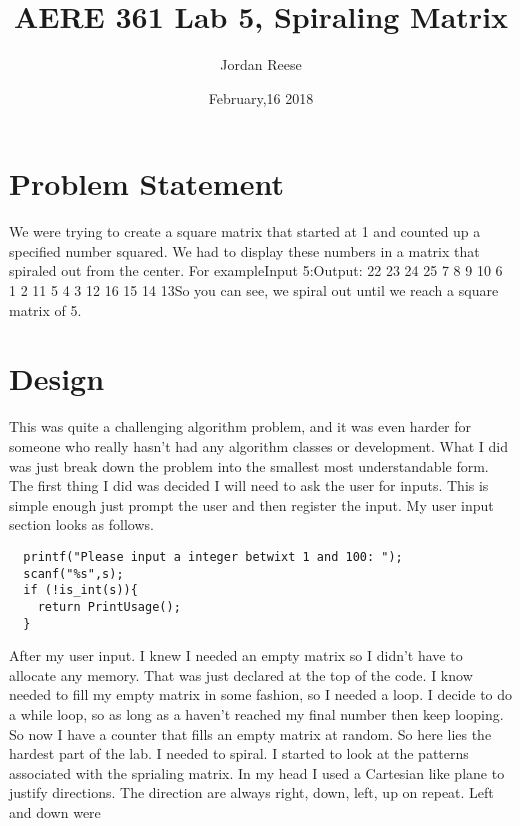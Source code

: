 \documentclass{article} \usepackage[utf8]{inputenc} \title{AERE 361 Lab 5, Spiraling Matrix} \author{Jordan Reese} \date{February,16 2018} \usepackage{listings} \usepackage{color} \definecolor{dkgreen}{rgb}{0,0.6,0}
\begin{document}
 \maketitle \section{Problem Statement} We were trying to create a square matrix that started at 1 and counted up a specified number squared. We had to display these numbers in a matrix that spiraled out from the 
center. For example\newline Input 5:\newline Output: 22 23 24 25 7 { }{ }8 { }9 10 6 { }{ }1 { }2 11 5 { }{ }4 { }3 12 16 15 14 13\newline So you can see, we spiral 
out until we reach a square matrix of 5. \section{Design} This was quite a challenging algorithm problem, and it was even harder for someone who really hasn't had any algorithm classes or development. What I did was just break 
down the problem into the smallest most understandable form. The first thing I did was decided I will need to ask the user for inputs. This is simple enough just prompt the user and then register the input. My user input section 
looks as follows. \begin{verbatim}
  printf("Please input a integer betwixt 1 and 100: ");
  scanf("%s",s);
  if (!is_int(s)){
    return PrintUsage();
  }
\end{verbatim} After my user input. I knew I needed an empty matrix so I didn't have to allocate any memory. That was just declared at the top of the code. \newline \indent I know needed to fill my empty matrix in some fashion, 
so I needed a loop. I decide to do a while loop, so as long as a haven't reached my final number then keep looping. So now I have a counter that fills an empty matrix at random. So here lies the hardest part of the lab. I needed 
to spiral. I started to look at the patterns associated with the sprialing matrix. In my head I used a Cartesian like plane to justify directions. The direction are always right, down, left, up on repeat. Left and down were 
\end{document}
